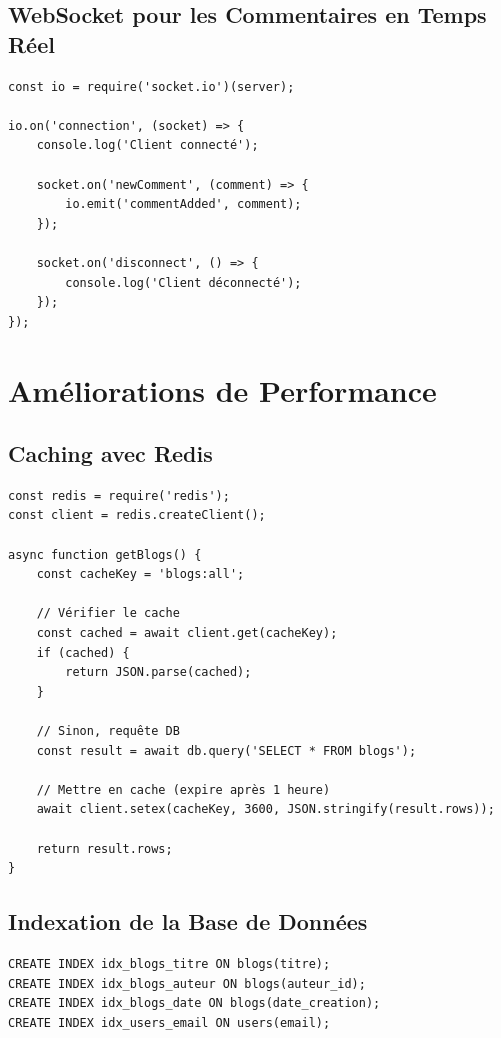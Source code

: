 \subsection{WebSocket pour les Commentaires en Temps Réel}

\begin{lstlisting}[style=javascript, caption=WebSocket avec Socket.io]
const io = require('socket.io')(server);

io.on('connection', (socket) => {
    console.log('Client connecté');
    
    socket.on('newComment', (comment) => {
        io.emit('commentAdded', comment);
    });
    
    socket.on('disconnect', () => {
        console.log('Client déconnecté');
    });
});
\end{lstlisting}

\section{Améliorations de Performance}

\subsection{Caching avec Redis}

\begin{lstlisting}[style=javascript, caption=Caching avec Redis]
const redis = require('redis');
const client = redis.createClient();

async function getBlogs() {
    const cacheKey = 'blogs:all';
    
    // Vérifier le cache
    const cached = await client.get(cacheKey);
    if (cached) {
        return JSON.parse(cached);
    }
    
    // Sinon, requête DB
    const result = await db.query('SELECT * FROM blogs');
    
    // Mettre en cache (expire après 1 heure)
    await client.setex(cacheKey, 3600, JSON.stringify(result.rows));
    
    return result.rows;
}
\end{lstlisting}

\subsection{Indexation de la Base de Données}

\begin{lstlisting}[style=sql, caption=Création d'index]
CREATE INDEX idx_blogs_titre ON blogs(titre);
CREATE INDEX idx_blogs_auteur ON blogs(auteur_id);
CREATE INDEX idx_blogs_date ON blogs(date_creation);
CREATE INDEX idx_users_email ON users(email);
\end{lstlisting}

